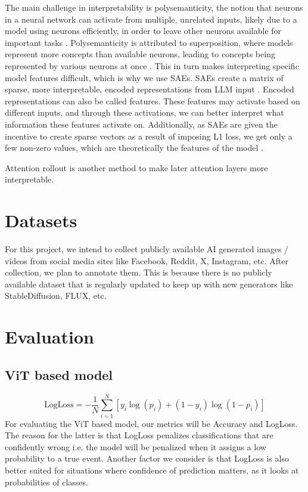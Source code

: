 \documentclass[10pt,twocolumn,letterpaper]{article}
\begin{document}
The main challenge in interpretability is polysemanticity, the notion that neurons in a neural network can activate from multiple, unrelated inputs, likely due to a model using neurons efficiently, in order to leave other neurons available for important tasks \cite{olah2020zoom}. Polysemanticity is attributed to superposition, where models represent more concepts than available neurons, leading to concepts being represented by various neurons at once  \cite{karvonen_intuitive_2024}.  This in turn makes interpreting specific model features difficult, which is why we use SAEs. SAEs create a matrix of sparse, more interpretable, encoded representations from LLM input  \cite{karvonen_intuitive_2024}. Encoded representations can also be called features. These features may activate based on different inputs, and through these activations, we can better interpret what information these features activate on. Additionally, as SAEs are given the incentive to create sparse vectors as a result of imposing L1 loss, we get only a few non-zero values, which are theoretically the  features of the model \cite{kutsyk_sparse_2024}. 

Attention rollout \cite{abnarQuantifyingAttentionFlow2020} is another method to make later attention layers more interpretable.

\section{Datasets}
For this project, we intend to collect publicly available AI generated images / videos from social media sites like Facebook, Reddit, X, Instagram, etc. After collection, we plan to annotate them. This is because there is no publicly available dataset that is regularly updated to keep up with new generators like StableDiffusion, FLUX, etc. 

\section{Evaluation}

\subsection{ViT based model}
\begin{equation}
\text{LogLoss} = - \frac{1}{N} \sum_{i=1}^{N}[y_{i}\log(p_i) + (1 - y_{i}) \log(1 - p_i)]
\label{eq:logloss}
\end{equation}
For evaluating the ViT based model, our metrics will be Accuracy and LogLoss. The reason for the latter is that LogLoss penalizes classifications that are confidently wrong i.e. the model will be penalized when it assigns a low probability to a true event. Another factor we consider is that LogLoss is also better suited for situations where confidence of prediction matters, as it looks at probabilities of classes.
\end{document}

